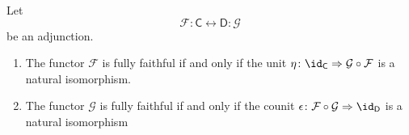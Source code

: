 \documentclass[notes.tex]{subfiles}
\begin{document}
\begin{proposition}
  \label{prop:conditions_for_fully_faithfulness_based_on_unit_or_counit}
  Let
  \begin{equation*}
    \mathcal{F} : \mathsf{C} \leftrightarrow \mathsf{D} : \mathcal{G}
  \end{equation*}
  be an adjunction.
  \begin{enumerate}
    \item The functor $\mathcal{F}$ is fully faithful if and only if the unit $\eta\colon \id_{\mathsf{C}} \Rightarrow \mathcal{G} \circ \mathcal{F}$ is a natural isomorphism.

    \item The functor $\mathcal{G}$ is fully faithful if and only if the counit $\epsilon\colon \mathcal{F} \circ \mathcal{G} \Rightarrow \id_{\mathsf{D}}$ is a natural isomorphism
  \end{enumerate}
\end{proposition}
\end{document}

